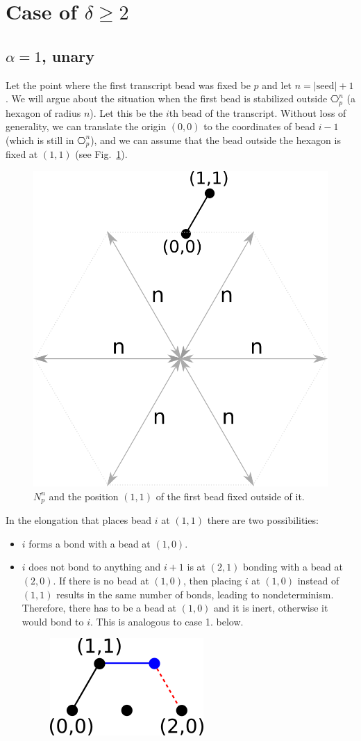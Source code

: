 \documentclass[runningheads]{llncs}
\begin{document}

\section{Case of $\delta \geq 2$}


\subsection{$\alpha = 1$, unary}

Let the point where the first transcript bead was fixed be $p$ and let $n=|\mathrm{seed}|+1$. We will argue about the situation when the first bead is stabilized outside $\hexagon_p^n$ (a hexagon of radius $n$). Let this be the $i$th bead of the transcript. Without loss of generality, we can translate the origin $(0,0)$ to the coordinates of bead $i-1$ (which is still in $\hexagon_p^n$), and we can assume that the bead outside the hexagon is fixed at $(1,1)$ (see Fig.~\ref{fig:hexagonOut}).
\begin{figure}
	\centering
	\includegraphics[width=0.3\linewidth]{./Fig/hexagonOut}
	\caption{$N_p^n$ and the position $(1,1)$ of the first bead fixed outside of it.}
	\label{fig:hexagonOut}
\end{figure}

In the elongation that places bead $i$ at $(1,1)$ there are two possibilities:
\begin{itemize}
	\item $i$ forms a bond with a bead at $(1,0)$.
	\item  $i$ does not bond to anything and $i+1$ is at $(2,1)$ bonding with a bead at $(2,0)$. If there is no bead at $(1,0)$, then placing $i$ at $(1,0)$ instead of $(1,1)$ results in the same number of bonds, leading to nondeterminism. Therefore, there has to be a bead at $(1,0)$ and it is inert, otherwise it would bond to $i$. This is analogous to case 1. below.%
	\begin{figure}
		\centering
		\includegraphics[width=0.2\linewidth]{./Fig/hexagonOut1}
		\label{fig:hexagonOut1}
	\end{figure}
	
\end{itemize}
 
\end{document}
